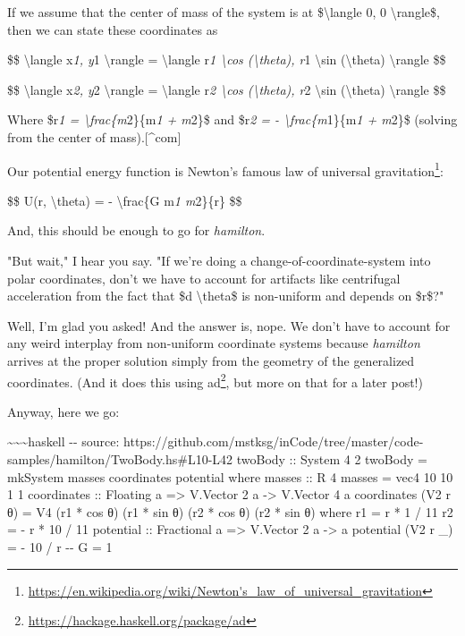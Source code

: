 \documentclass[]{article}
\renewcommand{\href}[2]{#2\footnote{\url{#1}}}
\begin{document}
If we assume that the center of mass of the system is at
\$\textbackslash{}langle 0, 0 \textbackslash{}rangle\$, then we can state these
coordinates as

\$\$ \textbackslash{}langle x\emph{1, y}1 \textbackslash{}rangle =
\textbackslash{}langle r\emph{1 \textbackslash{}cos (\textbackslash{}theta), r}1
\textbackslash{}sin (\textbackslash{}theta) \textbackslash{}rangle \$\$

\$\$ \textbackslash{}langle x\emph{2, y}2 \textbackslash{}rangle =
\textbackslash{}langle r\emph{2 \textbackslash{}cos (\textbackslash{}theta), r}2
\textbackslash{}sin (\textbackslash{}theta) \textbackslash{}rangle \$\$

Where \$r\emph{1 = \textbackslash{}frac\{m}2\}\{m\emph{1 + m}2\}\$ and
\$r\emph{2 = - \textbackslash{}frac\{m}1\}\{m\emph{1 + m}2\}\$ (solving from the
center of mass).{[}\^{}com{]}

Our potential energy function is Newton's famous
\href{https://en.wikipedia.org/wiki/Newton's_law_of_universal_gravitation}{law
of universal gravitation}:

\$\$ U(r, \textbackslash{}theta) = - \textbackslash{}frac\{G m\emph{1 m}2\}\{r\}
\$\$

And, this should be enough to go for \emph{hamilton}.

"But wait," I hear you say. "If we're doing a change-of-coordinate-system into
polar coordinates, don't we have to account for artifacts like centrifugal
acceleration from the fact that \$d \textbackslash{}theta\$ is non-uniform and
depends on \$r\$?"

Well, I'm glad you asked! And the answer is, nope. We don't have to account for
any weird interplay from non-uniform coordinate systems because \emph{hamilton}
arrives at the proper solution simply from the geometry of the generalized
coordinates. (And it does this using
\href{https://hackage.haskell.org/package/ad}{ad}, but more on that for a later
post!)

Anyway, here we go:

\textasciitilde{}\textasciitilde{}\textasciitilde{}haskell -\/- source:
https://github.com/mstksg/inCode/tree/master/code-samples/hamilton/TwoBody.hs\#L10-L42
twoBody :: System 4 2 twoBody = mkSystem masses coordinates potential where
masses :: R 4 masses = vec4 10 10 1 1 coordinates :: Floating a =\textgreater{}
V.Vector 2 a -\textgreater{} V.Vector 4 a coordinates (V2 r θ) = V4 (r1 * cos θ)
(r1 * sin θ) (r2 * cos θ) (r2 * sin θ) where r1 = r * 1 / 11 r2 = - r * 10 / 11
potential :: Fractional a =\textgreater{} V.Vector 2 a -\textgreater{} a
potential (V2 r \_) = - 10 / r -\/- G = 1
\end{document}
